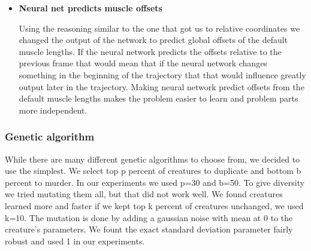 \begin{itemize}
            \item \textbf{Neural net predicts muscle offsets}

            Using the reasoning similar to the one that got us to relative coordinates we changed the output of the network to predict global offsets of the default muscle lengths. If the neural network predicts the offsets relative to the previous frame that would mean that if the neural network changes something in the beginning of the trajectory that that would influence greatly output later in the trajectory. Making neural network predict offsets from the default muscle lengths makes the problem easier to learn and problem parts more independent.
            
        \end{itemize}

    \hfill

\subsubsection{\textbf{\large Genetic algorithm}}
    While there are many different genetic algorithms to choose from, we decided to use the simplest. We select top p percent of creatures to duplicate and bottom b percent to murder. In our experiments we used p=30 and b=50. To give diversity we tried mutating them all, but that did not work well. We found creatures learned more and faster if we kept top k percent of creatures unchanged, we used k=10. The mutation is done by adding a gaussian noise with mean at 0 to the creature's parameters. We fount the exact standard deviation parameter fairly robust and used 1 in our experiments.
    
    
    
    